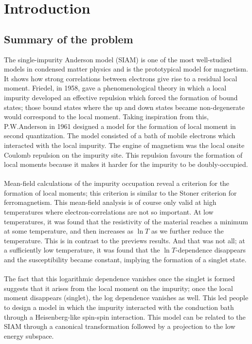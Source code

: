 \documentclass[twoside,11pt]{report}
\numberwithin{equation}{section}
\begin{document}
\chapter{Introduction}
\section{Summary of the problem}
The single-impurity Anderson model (SIAM) is one of the most well-studied models in condensed matter physics and is the prototypical model for magnetism.
It shows how strong correlations between electrons give rise to a residual local moment. Friedel\cite{Friedel}, in 1958, gave a phenomenological theory in which a local impurity developed an effective repulsion which forced the formation of bound states; those bound states where the up and down states became non-degenerate would correspond to the local moment.
Taking inspiration from this, P.W.Anderson\cite{Anderson} in 1961 designed a model for the formation of local moment in second quantization.
The model consisted of a bath of mobile electrons which interacted with the local impurity.
The engine of magnetism was the local onsite Coulomb repulsion on the impurity site.
This repulsion favours the formation of local moments because it makes it harder for the impurity to be doubly-occupied.
\\\\ Mean-field calculations of the impurity occupation reveal a criterion for the formation of local moments; this criterion is similar to the Stoner criterion for ferromagnetism. This mean-field analysis is of course only valid at high temperatures where electron-correlations are not so important. At low temperatures, it was found that the resistivity of the material reaches a minimum at some temperature, and then increases as \(\ln T\) as we further reduce the temperature. This is in contrast to the previews results. And that was not all; at a sufficiently low temperature, it was found that the \(\ln T\)-dependence disappears and the susceptibility became constant, implying the formation of a singlet state.
\\\\ The fact that this logarithmic dependence vanishes once the singlet is formed suggests that it arises from the local moment on the impurity; once the local moment disappears (singlet), the log dependence vanishes as well.
This led people to design a model in which the impurity interacted with the conduction bath through a Heisenberg-like spin-spin interaction.
This model can be related to the SIAM through a canonical transformation followed by a projection to the low energy subspace.
\end{document}
